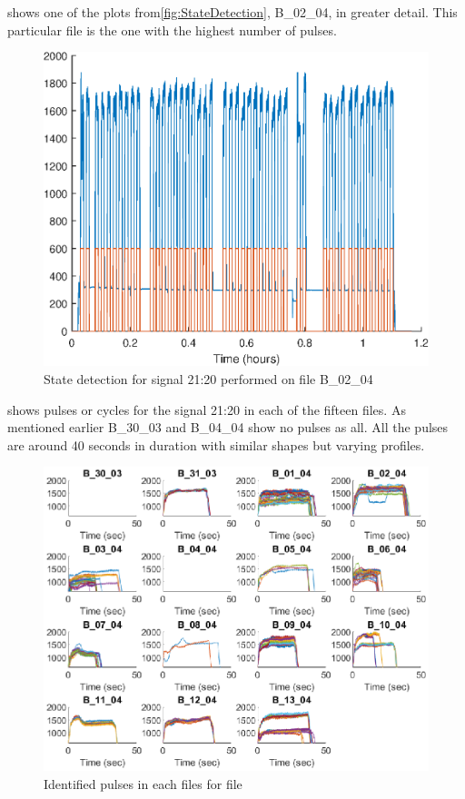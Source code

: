\documentclass[]{article}
\begin{document}
 shows one of the plots from\cref{fig:StateDetection}, B\_02\_04, in greater detail. This particular file is the one with the highest number of pulses.

\begin{figure}[H]
    \centering
    \includegraphics[scale=0.75]{figures/StateDetectionFig_B_02_04.eps}
    \caption{State detection for signal 21:20 performed on file B\_02\_04}
    \label{fig:StateDetectionFig_B_02_04}
\end{figure}

 shows pulses or cycles for the signal 21:20 in each of the fifteen files. As mentioned earlier B\_30\_03 and B\_04\_04 show no pulses as all. All the pulses are around 40 seconds in duration with similar shapes but varying profiles.
 
\begin{figure}[H]
    \centering
    \includegraphics[width=\textwidth, height=\textheight, keepaspectratio]{figures/IdentifiedPulsesFig.eps}
    \caption{Identified pulses in each files for file}
    \label{fig:IdentifiedPulses}
\end{figure}
\end{document}

